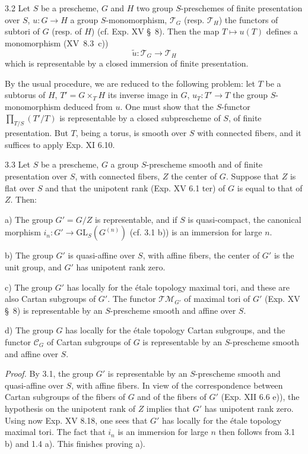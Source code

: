 \begin{lemma}{3.2}\label{XVI.3.2}
Let $S$ be a prescheme, $G$ and $H$ two group $S$-preschemes of finite presentation over $S$, $u:G\to H$ a group $S$-monomorphism, $\mathscr T_G$ (resp. $\mathscr T_H$) the functors of subtori of $G$ (resp. of $H$) (cf. Exp. XV \S\ 8). Then the map $T\mapsto u(T)$ defines a monomorphism (XV~8.3~c))
\[
\widetilde u:\mathscr T_G\longrightarrow\mathscr T_H
\]
which is representable by a closed immersion of finite presentation.
\end{lemma}
By the usual procedure, we are reduced to the following problem: let $T$ be a subtorus of $H$, $T'=G\times_T H$ its inverse image in $G$, $u_T:T'\to T$ the group $S$-monomorphism deduced from $u$. One must show that the $S$-functor $\prod_{T/S}(T'/T)$ is representable by a closed subprescheme of $S$, of finite presentation. But $T$, being a torus, is smooth over $S$ with connected fibers, and it suffices to apply Exp. XI 6.10.
\begin{theorem}{3.3}\label{XVI.3.3}
Let $S$ be a prescheme, $G$ a group $S$-prescheme smooth and of finite presentation over $S$, with connected fibers, $Z$ the center of $G$. Suppose that $Z$ is flat over $S$ and that the unipotent rank (Exp. XV 6.1 ter) of $G$ is equal to that of $Z$. Then:

\noindent a) The group $G'=G/Z$ is representable, and if $S$ is quasi-compact, the canonical morphism $i_n:G'\to\mathrm{GL}_S(G^{(n)})$ (cf. 3.1 b)) is an immersion for large $n$.

\noindent b) The group $G'$ is quasi-affine over $S$, with affine fibers, the center of $G'$ is the unit group, and $G'$ has unipotent rank zero.

\noindent c) The group $G'$ has locally for the étale topology maximal tori, and these are also Cartan subgroups of $G'$. The functor $\mathscr{TM}_{G'}$ of maximal tori of $G'$ (Exp. XV \S\ 8) is representable by an $S$-prescheme smooth and affine over $S$.

\noindent d) The group $G$ has locally for the étale topology Cartan subgroups, and the functor $\mathscr C_G$ of Cartan subgroups of $G$ is representable by an $S$-prescheme smooth and affine over $S$.
\end{theorem}
\par\noindent\emph{Proof.}
By 3.1, the group $G'$ is representable by an $S$-prescheme smooth and quasi-affine over $S$, with affine fibers. In view of the correspondence between Cartan subgroups of the fibers of $G$ and of the fibers of $G'$ (Exp. XII 6.6 e)), the hypothesis on the unipotent rank of $Z$ implies that $G'$ has unipotent rank zero. Using now Exp. XV 8.18, one sees that $G'$ has locally for the étale topology maximal tori. The fact that $i_n$ is an immersion for large $n$ then follows from 3.1 b) and 1.4 a). This finishes proving a).

